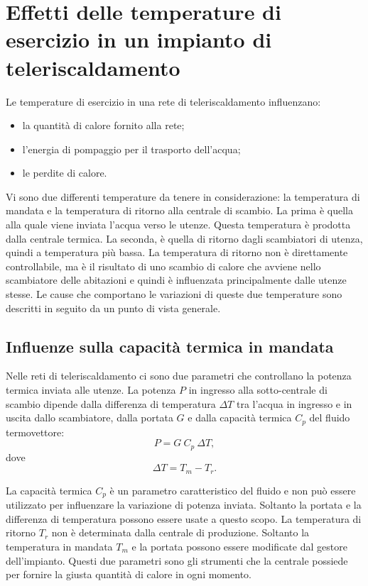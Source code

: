 \documentclass[laurea,oneside,11pt]{USiena_tesiLM}
\begin{document}
\section{Effetti delle temperature di esercizio in un impianto di teleriscaldamento}
Le temperature di esercizio in una rete di teleriscaldamento  influenzano:
\begin{itemize}
\item la quantità di calore fornito alla rete;
\item l'energia di pompaggio per il trasporto dell'acqua;
\item le perdite di calore.
\end{itemize}

Vi sono due differenti temperature da tenere in considerazione: la temperatura di mandata e la temperatura di ritorno alla centrale di scambio. La prima è quella alla quale viene inviata l'acqua verso le utenze. Questa temperatura è prodotta dalla centrale termica. La seconda, è quella di ritorno dagli scambiatori di utenza, quindi a temperatura più bassa. La temperatura di ritorno non è direttamente controllabile, ma è il risultato di uno scambio di calore che avviene nello scambiatore delle abitazioni e quindi è influenzata principalmente dalle utenze stesse.
Le cause che comportano le variazioni di queste due temperature sono descritti in seguito da un punto di vista generale. 

\subsection{Influenze sulla capacità termica in mandata}
Nelle reti di teleriscaldamento ci sono due parametri che controllano la potenza termica inviata alle utenze. La potenza $P$ in ingresso alla sotto-centrale di scambio dipende dalla differenza di temperatura  $\Delta T$ tra l'acqua in ingresso e  in uscita dallo scambiatore, dalla portata $G$ e dalla capacità termica $C_p$ del fluido termovettore:
\begin{equation}
P = G \ C_p \ \Delta T ,
\label{eq:Potenza}
\end{equation} 
dove
\begin{equation}
\Delta T = T_{m} - T_{r} .
\label{eq:dT}
\end{equation}

La capacità termica $C_p$ è un parametro caratteristico del fluido e non può essere utilizzato per influenzare la variazione di potenza inviata. Soltanto la portata e la differenza di temperatura   possono essere usate a questo scopo. La temperatura di ritorno $T_{r}$ non è determinata dalla centrale di produzione. Soltanto la temperatura in mandata $T_{m}$ e la portata possono essere modificate dal gestore dell'impianto.
Questi due parametri sono gli strumenti che la centrale possiede per fornire la giusta quantità di calore in ogni momento.
\end{document}
